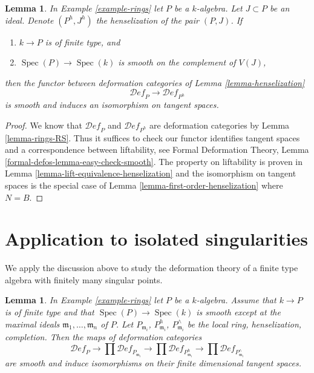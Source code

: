 \documentclass{stacks-project}
\theoremstyle{plain}
\newtheorem{lemma}[subsection]{Lemma}
\theoremstyle{definition}
\theoremstyle{remark}
\numberwithin{equation}{subsection}
\def\Spec{\mathop{\mathrm{Spec}}}
\def\Deformationcategory{\mathcal{D}\!\mathit{ef}}
\begin{document}
\begin{lemma}
\label{lemma-smooth-henselization}
In Example \ref{example-rings} let $P$ be a $k$-algebra.
Let $J \subset P$ be an ideal.
Denote $(P^h, J^h)$ the henselization of the pair $(P, J)$. If
\begin{enumerate}
\item $k \to P$ is of finite type, and
\item $\Spec(P) \to \Spec(k)$ is smooth on the complement of $V(J)$,
\end{enumerate}
then the functor between deformation categories of
Lemma \ref{lemma-henselization}
$$
\Deformationcategory_P \longrightarrow \Deformationcategory_{P^h}
$$
is smooth and induces an isomorphism on tangent spaces.
\end{lemma}

\begin{proof}
We know that $\Deformationcategory_P$ and $\Deformationcategory_{P^h}$
are deformation categories by Lemma \ref{lemma-rings-RS}.
Thus it suffices to check
our functor identifies tangent spaces and a correspondence
between liftability, see
Formal Deformation Theory, Lemma \ref{formal-defos-lemma-easy-check-smooth}.
The property on liftability is proven in
Lemma \ref{lemma-lift-equivalence-henselization}
and the isomorphism on tangent spaces is the special case of
Lemma \ref{lemma-first-order-henselization} where $N = B$.
\end{proof}



\section{Application to isolated singularities}
\label{section-isolated}

\noindent
We apply the discussion above to study the deformation theory
of a finite type algebra with finitely many singular points.

\begin{lemma}
\label{lemma-isolated}
In Example \ref{example-rings} let $P$ be a $k$-algebra.
Assume that $k \to P$ is of finite type and that $\Spec(P) \to \Spec(k)$
is smooth except at the maximal ideals
$\mathfrak m_1, \ldots, \mathfrak m_n$ of $P$.
Let $P_{\mathfrak m_i}$, $P_{\mathfrak m_i}^h$, $P_{\mathfrak m_i}^\wedge$
be the local ring, henselization, completion.
Then the maps of deformation categories
$$
\Deformationcategory_P \to
\prod \Deformationcategory_{P_{\mathfrak m_i}} \to
\prod \Deformationcategory_{P_{\mathfrak m_i}^h} \to
\prod \Deformationcategory_{P_{\mathfrak m_i}^\wedge}
$$
are smooth and induce isomorphisms on their finite dimensional
tangent spaces.
\end{lemma}
\end{document}
